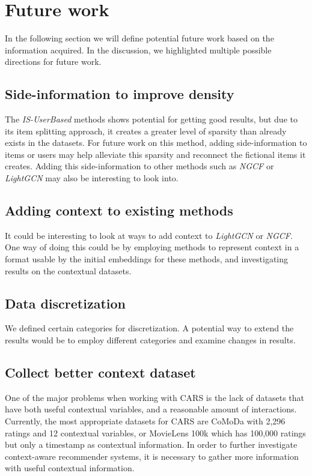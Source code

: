 \section{Future work}\label{sec:futurework}
In the following section we will define potential future work based on the information acquired.
In the discussion, we highlighted multiple possible directions for future work.

\subsection{Side-information to improve density}
The \textit{IS-UserBased} methods shows potential for getting good results, but due to its item splitting approach, it creates a greater level of sparsity than already exists in the datasets.
For future work on this method, adding side-information to items or users may help alleviate this sparsity and reconnect the fictional items it creates.
Adding this side-information to other methods such as \textit{NGCF} or \textit{LightGCN} may also be interesting to look into.

\subsection{Adding context to existing methods}
It could be interesting to look at ways to add context to \textit{LightGCN} or \textit{NGCF}.
One way of doing this could be by employing methods to represent context in a format usable by the initial embeddings for these methods, and investigating results on the contextual datasets.

\subsection{Data discretization}
We defined certain categories for discretization.
A potential way to extend the results would be to employ different categories and examine changes in results.

\subsection{Collect better context dataset}
One of the major problems when working with CARS is the lack of datasets that have both useful contextual variables, and a reasonable amount of interactions.
Currently, the most appropriate datasets for CARS are CoMoDa with 2,296 ratings and 12 contextual variables, or MovieLens 100k which has 100,000 ratings but only a timestamp as contextual information.
In order to further investigate context-aware recommender systems, it is necessary to gather more information with useful contextual information.

